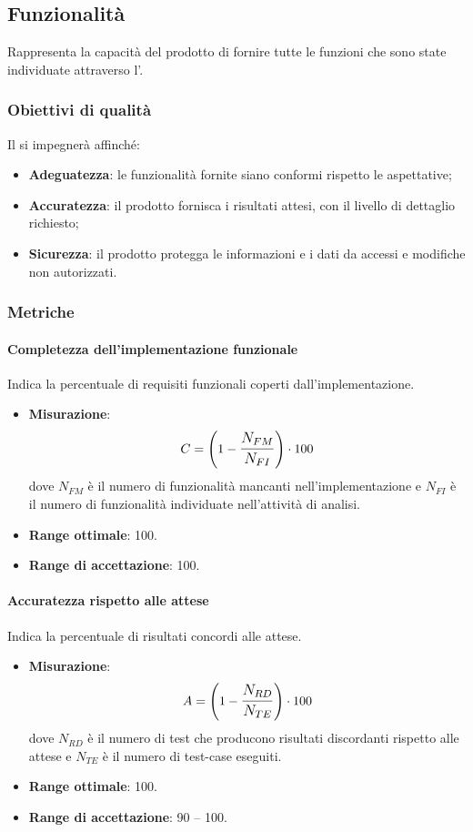 \subsection{Funzionalità}
Rappresenta la capacità del prodotto di fornire tutte le funzioni che sono state individuate attraverso l'\AdR.

\subsubsection{Obiettivi di qualità}
Il  si impegnerà affinché:
\begin{itemize}
\item \textbf{Adeguatezza}: le funzionalità fornite siano conformi rispetto le aspettative;
\item \textbf{Accuratezza}: il prodotto fornisca i risultati attesi, con il livello di dettaglio richiesto;
\item \textbf{Sicurezza}: il prodotto protegga le informazioni e i dati da accessi e modifiche non autorizzati.
\end{itemize}

\subsubsection{Metriche}
\paragraph{Completezza dell'implementazione funzionale}
Indica la percentuale di requisiti funzionali coperti dall'implementazione.
\begin{itemize}
	\item \textbf{Misurazione}: 
		$$C=\left(1-\mathlarger{\frac{N_{FM}}{N_{FI}}}\right) \cdot 100$$ 
	dove $N_{FM}$ è il numero di funzionalità mancanti nell'implementazione e $N_{FI}$ è il numero di funzionalità individuate nell'attività di analisi.
	\item \textbf{Range ottimale}: 100.
	\item \textbf{Range di accettazione}: 100.
\end{itemize}

\paragraph{Accuratezza rispetto alle attese}
Indica la percentuale di risultati concordi alle attese.
\begin{itemize}
	\item \textbf{Misurazione}: 
		$$A=\left(1-\mathlarger{\frac{N_{RD}}{N_{TE}}}\right) \cdot 100$$
	dove $N_{RD}$ è il numero di test che producono risultati discordanti rispetto alle attese e $N_{TE}$ è il numero di test-case eseguiti.
	\item \textbf{Range ottimale}: 100.
	\item \textbf{Range di accettazione}: 90 -- 100.
\end{itemize}

